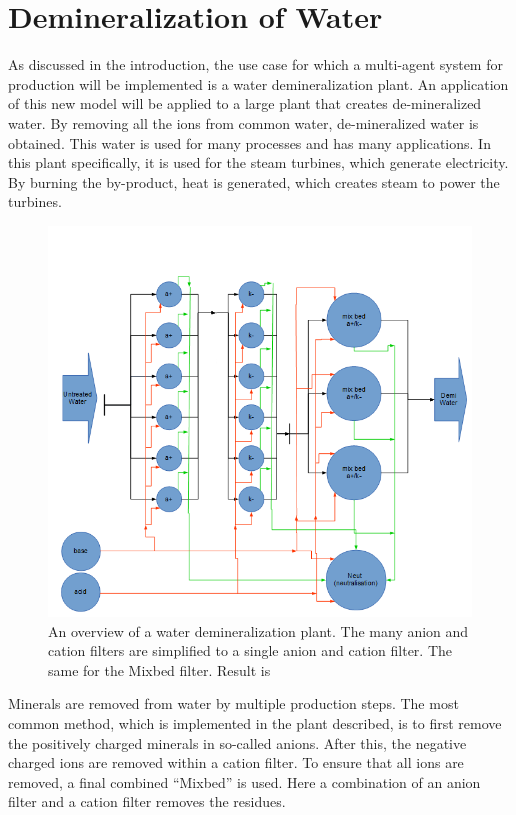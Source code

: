 \section{Demineralization of Water}
\label{sec:demi}
As discussed in the introduction, the use case for which a multi-agent system for production will be implemented is a water demineralization plant. An application of this new model will be applied to a large plant that creates de-mineralized water. By removing all the ions from common water, de-mineralized water is obtained. This water is used for many processes and has many applications. In this plant specifically, it is used for the steam turbines, which generate electricity. By burning the by-product, heat is generated, which creates steam to power the turbines. 

\begin{figure}[h]
	\centering
	\includegraphics[width=1\linewidth]{img/demi-plant}
	\caption{An overview of a water demineralization plant. The many anion and cation filters are simplified to a single anion and cation filter. The same for the Mixbed filter. Result is }
	\label{fig:demi-plant}
\end{figure}

Minerals are removed from water by multiple production steps. The most common method, which is implemented in the plant described, is to first remove the positively charged minerals in so-called anions. After this, the negative charged ions are removed within a cation filter. To ensure that all ions are removed, a final combined ``Mixbed'' is used. Here a combination of an anion filter and a cation filter removes the residues.

